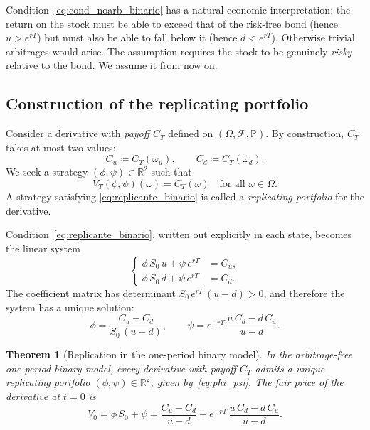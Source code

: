 \documentclass[11pt,a4paper,oneside]{report}
\theoremstyle{plain}
\newtheorem{teorema}{Theorem}[chapter]
\theoremstyle{definition}
\theoremstyle{remark}
\newcommand{\R}{\mathbb{R}}
\newcommand{\PP}{\mathbb{P}}
\newcommand{\F}{\mathcal{F}}
\newcommand{\1}{\mathbf{1}}
\newcommand{\eqdef}{\coloneqq}
\begin{document}
Condition~\eqref{eq:cond_noarb_binario} has a natural economic
interpretation: the return on the stock must be able to exceed that of
the risk-free bond (hence $u > e^{rT}$) but must also be able to fall
below it (hence $d < e^{rT}$). Otherwise trivial arbitrages would
arise. The assumption requires the stock to be genuinely \emph{risky}
relative to the bond. We assume it from now on.

\subsection{Construction of the replicating portfolio}
\label{subsec:replicante_binario}

Consider a derivative with \emph{payoff} $C_T$ defined on
$(\Omega, \F, \PP)$. By construction, $C_T$ takes at most two values:
\begin{equation*}
  C_u \eqdef C_T(\omega_u), \qquad C_d \eqdef C_T(\omega_d).
\end{equation*}
We seek a strategy $(\phi, \psi) \in \R^2$ such that
\begin{equation}\label{eq:replicante_binario}
  V_T(\phi, \psi)(\omega) = C_T(\omega) \quad \text{for all } \omega \in \Omega.
\end{equation}
A strategy satisfying \eqref{eq:replicante_binario} is called a
\emph{replicating portfolio} for the derivative.

Condition~\eqref{eq:replicante_binario}, written out explicitly in
each state, becomes the linear system
\begin{equation}\label{eq:sistema_replicante}
  \left\{
  \begin{aligned}
    \phi\, S_0\, u + \psi\, e^{rT} &= C_u, \\
    \phi\, S_0\, d + \psi\, e^{rT} &= C_d.
  \end{aligned}
  \right.
\end{equation}
The coefficient matrix has determinant $S_0\, e^{rT}\, (u - d) > 0$,
and therefore the system has a unique solution:
\begin{equation}\label{eq:phi_psi}
  \phi = \frac{C_u - C_d}{S_0\,(u - d)}, \qquad
  \psi = e^{-rT}\, \frac{u\, C_d - d\, C_u}{u - d}.
\end{equation}

\begin{teorema}[Replication in the one-period binary model]
\label{teo:replicacion_binario}
In the arbitrage-free one-period binary model, every derivative with
\emph{payoff} $C_T$ admits a unique replicating portfolio
$(\phi, \psi) \in \R^2$, given by~\eqref{eq:phi_psi}. The fair price
of the derivative at $t = 0$ is
\begin{equation}\label{eq:precio_binario}
  V_0 = \phi\, S_0 + \psi
       = \frac{C_u - C_d}{u - d}
       + e^{-rT}\, \frac{u\, C_d - d\, C_u}{u - d}.
\end{equation}
\end{teorema}
\end{document}
